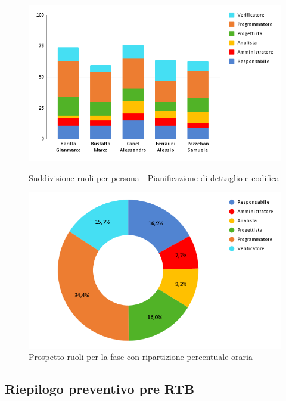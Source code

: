 \begin{figure}[h!]
	\centering
	\begin{minipage}[c]{0.40\textwidth}
		\includegraphics[scale=0.47]{../../assets/Diagrammi_Excel/RuoliPersone-DTECD.png}
		\caption{Suddivisione ruoli per persona - Pianificazione di dettaglio e codifica}
	\end{minipage}
\hfill
	\begin{minipage}[c]{0.46\textwidth}
		\includegraphics[scale=0.37]{../../assets/Diagrammi_Excel/TortaRuoli-DTECD.png}
		\caption{Prospetto ruoli per la fase con ripartizione percentuale oraria}
	\end{minipage}
\end{figure}

\newpage

\subsection{Riepilogo preventivo pre RTB}

